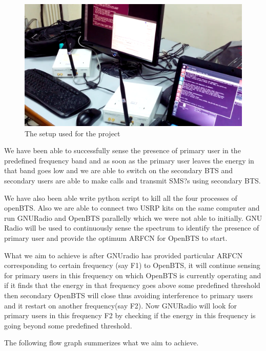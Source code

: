 \begin{figure}[h]
\centering
\includegraphics[width=1\textwidth]{workSetup}
\caption{The setup used for the project}
\label{workSetup}
\end{figure}










 
 
We have been able to successfully sense the presence of primary user in the predefined frequency band and as soon as the primary user leaves the energy in that band goes low and we are able to switch on the secondary BTS and secondary users are able to make calls and transmit SMS?s using secondary BTS. 

We have also been able write python script to kill all the four processes of openBTS. Also we are able to connect two USRP kits on the same computer and run GNURadio and OpenBTS parallelly which we were not able to initially. GNU Radio will be used to continuously sense the spectrum to identify the presence of primary user and provide the optimum ARFCN for OpenBTS to start. 

What we aim to achieve is after GNUradio has provided particular ARFCN corresponding to certain frequency (say F1) to OpenBTS, it will continue sensing for primary users in this frequency on which OpenBTS is currently operating and if it finds that the energy in that frequency goes above some predefined threshold then secondary OpenBTS will close thus avoiding interference to primary users and it restart on another frequency(say F2). Now GNURadio will look for primary users in this frequency F2 by checking if the energy in this frequency is going beyond some predefined threshold.

 
The following flow graph summerizes what we aim to achieve.

